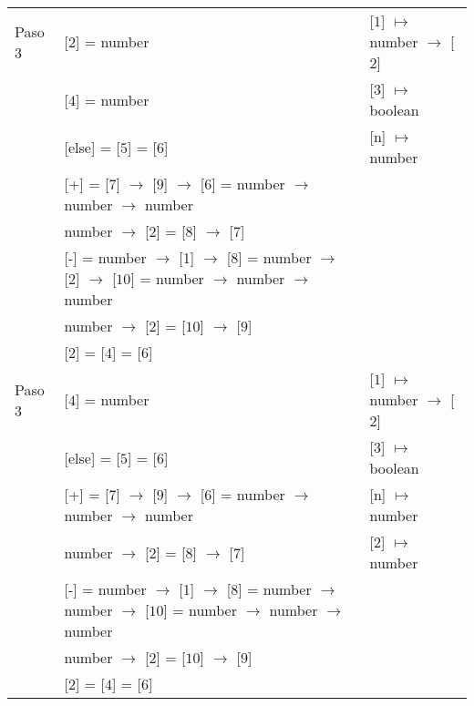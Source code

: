 \documentclass{article}
\begin{document}
\begin{center}
\begin{longtable}{ | l | p{10 cm} | p{5 cm} | }
  Paso 3 & [2] = number														& [$\boxed{1}$] $\mapsto$ number $\rightarrow$ [$\boxed{2}$] \\
	 & [$\boxed{4}$] = number												& [$\boxed{3}$] $\mapsto$ boolean	\\ 
	 & [else] = [$\boxed{5}$] = [$\boxed{6}$]										& [n] $\mapsto$ number	\\
	 & [+] = [$\boxed{7}$] $\rightarrow$ [$\boxed{9}$] $\rightarrow$ [$\boxed{6}$] = 
	 number $\rightarrow$ number $\rightarrow$ number									&	\\ 
	 & number $\rightarrow$ [$\boxed{2}$] = [$\boxed{8}$] $\rightarrow$ [$\boxed{7}$]					&	\\
	 & [-] = number $\rightarrow$ [1] $\rightarrow$ [$\boxed{8}$] = number $\rightarrow$ [2] $\rightarrow$ [$\boxed{10}$] =
	   number $\rightarrow$ number $\rightarrow$ number									&	\\
	 & number $\rightarrow$ [$\boxed{2}$] = [$\boxed{10}$] $\rightarrow$ [$\boxed{9}$] 					&	\\ 
	 & [$\boxed{2}$] = [$\boxed{4}$] = [$\boxed{6}$]									&	\\ \hline
	 
 Paso 3  & [$\boxed{4}$] = number												& [$\boxed{1}$] $\mapsto$ number $\rightarrow$ [$\boxed{2}$]	\\ 
	 & [else] = [$\boxed{5}$] = [$\boxed{6}$]										& [$\boxed{3}$] $\mapsto$ boolean	\\
	 & [+] = [$\boxed{7}$] $\rightarrow$ [$\boxed{9}$] $\rightarrow$ [$\boxed{6}$] = 
	 number $\rightarrow$ number $\rightarrow$ number									& [n] $\mapsto$ number	\\ 
	 & number $\rightarrow$ [$\boxed{2}$] = [$\boxed{8}$] $\rightarrow$ [$\boxed{7}$]					& [2] $\mapsto$ number	\\
	 & [-] = number $\rightarrow$ [1] $\rightarrow$ [$\boxed{8}$] = number $\rightarrow$ number $\rightarrow$ [$\boxed{10}$] =
	   number $\rightarrow$ number $\rightarrow$ number									&	\\
	 & number $\rightarrow$ [$\boxed{2}$] = [$\boxed{10}$] $\rightarrow$ [$\boxed{9}$] 					&	\\ 
	 & [$\boxed{2}$] = [$\boxed{4}$] = [$\boxed{6}$]									&	\\ \hline
	 

\end{longtable}
\end{center}
\end{document}

